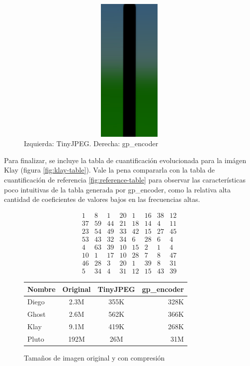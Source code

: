 \begin{figure}
    \includegraphics[width=400pt, height=200pt]{banding}
    \caption{Izquierda: TinyJPEG. Derecha: gp\_encoder}
    \label{img:banding}
\end{figure}

Para finalizar, se incluye la tabla de cuantificación evolucionada para la
imágen Klay (figura \ref{fig:klay-table}). Vale la pena compararla con la tabla de
cuantificación de referencia \ref{fig:reference-table} para observar las
características poco intuitivas de la tabla generada por gp\_encoder, como la
relativa alta cantidad de coeficientes de valores bajos en las frecuencias
altas.


\begin{equation}
    \begin{matrix}
        1  &   8  &  1  & 20  &  1  & 16  & 38  & 12 \\
        37 &   59 &  44 &  21 &  18 &  14 &   4 &  11 \\
        23 &   54 &  49 &  33 &  42 &  15 &  27 &  45 \\
        53 &   43 &  32 &  34 &   6 &  28 &   6 &   4 \\
        4  &  63  & 39  & 10  & 15  &  2  &  1  &  4 \\
        10 &    1 &  17 &  10 &  28 &   7 &   8 &  47 \\
        46 &   28 &   3 &  20 &   1 &  39 &   8 &  31 \\
        5  &  34  &  4  & 31  & 12  & 15  & 43  & 39
    \end{matrix}
    \label{fig:klay-table}
\end{equation}

\begin{figure}[h]
    \begin{tabular}{|l c c r|}
        \hline
        Nombre & Original & TinyJPEG & gp\_encoder \\
        \hline
        Diego & 2.3M & 355K & 328K \\
        Ghost & 2.6M & 562K & 366K \\
        Klay  & 9.1M & 419K & 268K \\
        Pluto & 192M & 26M & 31M  \\
        \hline
    \end{tabular}
    \caption{Tamaños de imagen original y con compresión}
    \label{fig:size-table}
\end{figure}


